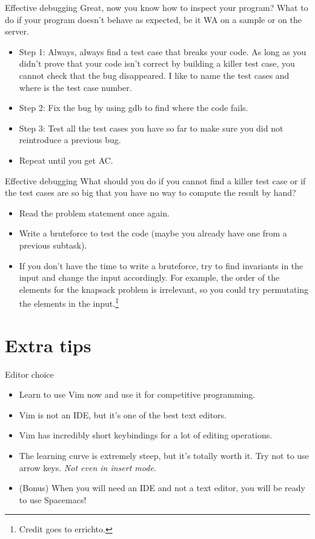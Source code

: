 \documentclass[handout,code=programming-tricks,title={Efficient
  implementation and debugging}]{../share/cpslide}
\begin{document}
\begin{frame}{Effective debugging}
  Great, now you know how to inspect your program? What to do if your program
  doesn't behave as expected, be it WA on a sample or on the server.
  \begin{itemize}
  \item Step 1: Always, always find a test case that breaks your code. As long
    as you didn't prove that your code isn't correct by building a killer test
    case, you cannot check that the bug disappeared. I like to name the test
    cases  and  where  is the test case number.
  \item Step 2: Fix the bug by using gdb to find where the code fails.
  \item Step 3: Test all the test cases you have so far to make sure you did not
    reintroduce a previous bug.
  \item Repeat until you get AC.
  \end{itemize}
\end{frame}

\begin{frame}{Effective debugging}
  What should you do if you cannot find a killer test case or if the test cases
  are so big that you have no way to compute the result by hand?
  \begin{itemize}
  \item Read the problem statement once again.
  \item Write a bruteforce to test the code (maybe you already have one from a
    previous subtask).
  \item If you don't have the time to write a bruteforce, try to find invariants
    in the input and change the input accordingly. For example, the order of the
    elements for the knapsack problem is irrelevant, so you could try
    permutating the elements in the input.\footnote{Credit goes to errichto.}
  \end{itemize}
\end{frame}

\section{Extra tips}
\begin{frame}{Editor choice}
  \begin{itemize}
  \item Learn to use Vim now and use it for competitive programming.
  \item Vim is not an IDE, but it's one of the best text editors.
  \item Vim has incredibly short keybindings for a lot of editing operations.
  \item The learning curve is extremely steep, but it's totally worth it. Try
    not to use arrow keys. \textit{Not even in insert mode.}
  \item (Bonus) When you will need an IDE and not a text editor, you will be
    ready to use Spacemacs!
  \end{itemize}
\end{frame}
\end{document}
